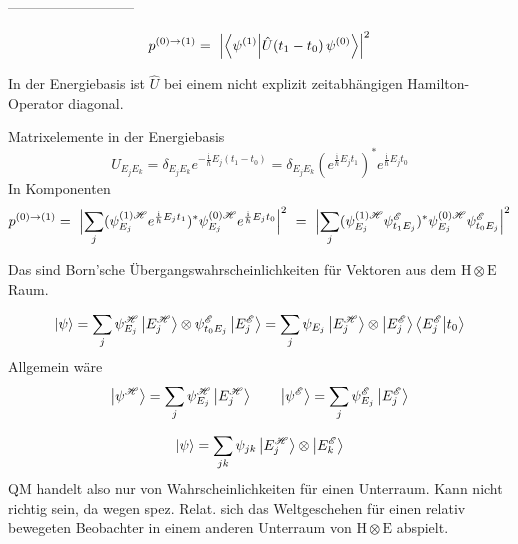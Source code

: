 \documentclass[12pt]{article}
\begin{document}
---------------------------

\begin{equation} 
\label{eq:conditional_probability}
p^{(0)\rightarrow(1)} =\ \Bigl| \bra{\psi^{(1)}}\ket{\hat{U}(t_1-t_0)\,\psi^{(0)}} \Bigr|^2
\end{equation}

In der Energiebasis ist $\hat{U}$ bei einem nicht explizit zeitabhängigen Hamilton-Operator diagonal.

Matrixelemente in der Energiebasis
\begin{equation} 
U_{E_j E_k} = \delta_{E_j E_k} e^{-\frac{\mathrm{i}}{\hbar}E_j(t_1-t_0)}
= 
\delta_{E_j E_k}(e^{\frac{\mathrm{i}}{\hbar}E_j t_1})^* e^{\frac{\mathrm{i}}{\hbar}E_j t_0}
\end{equation}
In Komponenten
\begin{equation} 
p^{(0)\rightarrow(1)} =\ 
\Bigl| \sum_j
(\psi_{E_j}^{(1)\mathscr{H}} e^{\frac{\mathrm{i}}{\hbar}E_j t_1})^*
\psi_{E_j}^{(0)\mathscr{H}} e^{\frac{\mathrm{i}}{\hbar}E_j t_0}
\Bigr|^2
\ = \ 
\Bigl| \sum_j
(\psi_{E_j}^{(1)\mathscr{H}} \psi_{t_1 E_j}^{\mathscr{E}})^*
\psi_{E_j}^{(0)\mathscr{H}} \psi_{t_0 E_j}^{\mathscr{E}}
\Bigr|^2
\end{equation}

Das sind Born'sche Übergangswahrscheinlichkeiten für Vektoren aus dem $\mathrm{H}\otimes\mathrm{E}$ Raum. 

\begin{equation}
\ket{\psi} = \sum_j \psi_{E_j}^\mathscr{H} \ket{E_j^\mathscr{H}} 
\otimes \psi_{t_0 E_j}^\mathscr{E} \ket{E_j^\mathscr{E}}
= \sum_j \psi_{E_j} \ket{E_j^{\mathscr{H}}} \otimes \ket{E_j^{\mathscr{E}}} \bra{E_j^{\mathscr{E}}}\ket{t_0}
\end{equation}
Allgemein wäre
\begin{equation}
\ket{\psi^\mathscr{H}} = \sum_j \psi_{E_j}^\mathscr{H} \ket{E_j^\mathscr{H}}
\quad\quad
\ket{\psi^\mathscr{E}} = \sum_j \psi_{E_j}^\mathscr{E} \ket{E_j^\mathscr{E}}
\end{equation}

\begin{equation}
\ket{\psi} = \sum_{jk} \psi_{jk} \ket{E_j^\mathscr{H}} \otimes \ket{E_k^{\mathscr{E}}}
\end{equation}
QM handelt also nur von Wahrscheinlichkeiten für einen Unterraum.
Kann nicht richtig sein, da wegen spez. Relat. sich das Weltgeschehen für einen relativ bewegeten Beobachter in einem anderen Unterraum von $\mathrm{H}\otimes\mathrm{E}$ abspielt.
\end{document}
